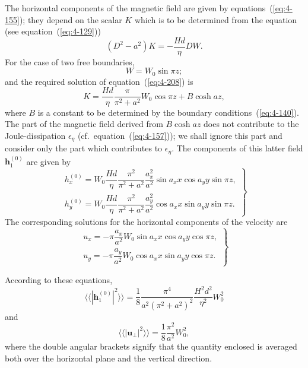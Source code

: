 The horizontal components of the magnetic field are given by equations~(\ref{eq:4-155}); they depend on the scalar $K$ which is to be determined from the equation (see equation~(\ref{eq:4-129}))
\begin{equation}
\label{eq:4-208}
(D^2-a^2)K = -\frac{Hd}{\eta}DW.
\end{equation}
For the case of two free boundaries,
\begin{equation}
\label{eq:4-209}
W = W_0\sin\pi z;
\end{equation}
and the required solution of equation~(\ref{eq:4-208}) is
\begin{equation}
\label{eq:4-210}
K = \frac{Hd}{\eta}\frac{\pi}{\pi^2+a^2}W_0\cos\pi z + B\cosh az,
\end{equation}
where $B$ is a constant to be determined by the boundary conditions~(\ref{eq:4-140}). The part of the magnetic field derived from $B\cosh az$ does not contribute to the Joule-dissipation $\epsilon_\eta$ (cf.\ equation~(\ref{eq:4-157})); we shall ignore this part and consider only the part which contributes to $\epsilon_\eta$. The components of this latter field $\mathbf{h}_1^{(0)}$ are given by
\begin{equation}
\label{eq:4-211}
\left.\begin{array}{l}
h_x^{(0)} = W_0\dfrac{Hd}{\eta}\dfrac{\pi^2}{\pi^2+a^2}\dfrac{a_x^2}{a^2}\sin a_x x\cos a_y y\sin\pi z, \\[8pt]
h_y^{(0)} = W_0\dfrac{Hd}{\eta}\dfrac{\pi^2}{\pi^2+a^2}\dfrac{a_y^2}{a^2}\cos a_x x\sin a_y y\sin\pi z.
\end{array}\right\}
\end{equation}
The corresponding solutions for the horizontal components of the velocity are
\begin{equation}
\label{eq:4-212}
\left.\begin{array}{l}
u_x = -\pi\dfrac{a_x}{a^2}W_0\sin a_x x\cos a_y y\cos\pi z, \\[8pt]
u_y = -\pi\dfrac{a_y}{a^2}W_0\cos a_x x\sin a_y y\cos\pi z.
\end{array}\right\}
\end{equation}

According to these equations,
\begin{equation}
\label{eq:4-213}
\langle\langle |\mathbf{h}_1^{(0)}|^2\rangle\rangle = \frac{1}{8}\frac{\pi^4}{a^2(\pi^2+a^2)^2}\frac{H^2 d^2}{\eta^2}W_0^2
\end{equation}
and
\begin{equation}
\label{eq:4-214}
\langle\langle |\mathbf{u}_\perp|^2\rangle\rangle = \frac{1}{8}\frac{\pi^2}{a^2}W_0^2,
\end{equation}
where the double angular brackets signify that the quantity enclosed is averaged both over the horizontal plane and the vertical direction.

